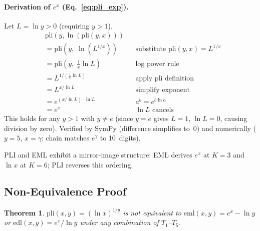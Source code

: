 \documentclass[10pt,twocolumn]{article}
\newtheorem{theorem}{Theorem}
\theoremstyle{remark}
\begin{document}
\paragraph{Derivation of $e^x$ (Eq.~\ref{eq:pli_exp}).}
Let $L = \ln y > 0$ (requiring $y > 1$).
\begin{align*}
&\mathrm{pli}(y, \ln(\mathrm{pli}(y, x)))\\
&= \mathrm{pli}(y,\; \ln(L^{1/x})) && \text{substitute } \mathrm{pli}(y,x) = L^{1/x}\\
&= \mathrm{pli}(y,\; \tfrac{1}{x}\ln L) && \text{log power rule}\\
&= L^{1/(\frac{1}{x}\ln L)} && \text{apply pli definition}\\
&= L^{x/\ln L} && \text{simplify exponent}\\
&= e^{(x/\ln L)\cdot \ln L} && a^b = e^{b \ln a}\\
&= e^x && \ln L \text{ cancels}
\end{align*}
This holds for any $y > 1$ with $y \neq e$ (since $y = e$ gives $L = 1$, $\ln L = 0$, causing division by zero). Verified by SymPy (difference simplifies to~0) and numerically ($y = 5$, $x = \gamma$: chain matches $e^\gamma$ to 10~digits).

PLI and EML exhibit a mirror-image structure: EML derives $e^x$ at $K{=}3$ and $\ln x$ at $K{=}6$; PLI reverses this ordering.

\subsection{Non-Equivalence Proof}

\begin{theorem}\label{thm:nonequiv}
$\mathrm{pli}(x,y) = (\ln x)^{1/y}$ is not equivalent to $\mathrm{eml}(x,y) = e^x - \ln y$ or $\mathrm{edl}(x,y) = e^x / \ln y$ under any combination of $T_1$--$T_5$.
\end{theorem}
\end{document}
